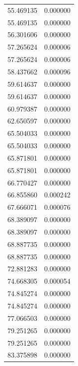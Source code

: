 \begin{longtable}{rr}
55.469135 & 0.000000 \\
55.469135 & 0.000000 \\
56.301606 & 0.000000 \\
57.265624 & 0.000006 \\
57.265624 & 0.000006 \\
58.437662 & 0.000096 \\
59.614637 & 0.000000 \\
59.614637 & 0.000000 \\
60.979387 & 0.000000 \\
62.650597 & 0.000000 \\
65.504033 & 0.000000 \\
65.504033 & 0.000000 \\
65.871801 & 0.000000 \\
65.871801 & 0.000000 \\
66.770427 & 0.000000 \\
66.855860 & 0.000242 \\
67.666071 & 0.000076 \\
68.389097 & 0.000000 \\
68.389097 & 0.000000 \\
68.887735 & 0.000000 \\
68.887735 & 0.000000 \\
72.881283 & 0.000000 \\
74.668305 & 0.000054 \\
74.845274 & 0.000000 \\
74.845274 & 0.000000 \\
77.066503 & 0.000000 \\
79.251265 & 0.000000 \\
79.251265 & 0.000000 \\
83.375898 & 0.000000 \\
\end{longtable}
